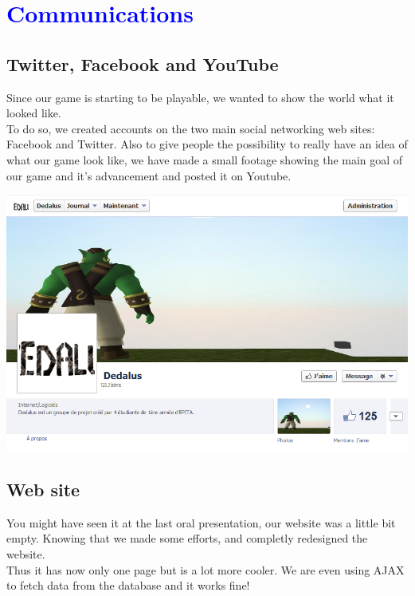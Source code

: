 \documentclass[article]{report}         %
\begin{document}
\chapter{\textcolor{blue}{Communications}}
			\section{Twitter, Facebook and YouTube }
				Since our game is starting to be playable, we wanted to show the world what it looked like.\\
				To do so, we created accounts on the two main social networking web sites: Facebook and Twitter. Also to give people the possibility to really have an idea of what our game look like, we have made a small footage showing the main goal of our game and it's advancement and posted it on Youtube.

				\includegraphics[width = 17cm]{images/fb.png}
				\newpage

			\section{Web site}
				You might have seen it at the last oral presentation, our website was a little bit empty. Knowing that we made some efforts, and completly redesigned the website.\\
				Thus it has now only one page but is a lot more cooler. We are even using AJAX to fetch data from the database and it works fine!\\
				
\end{document}
